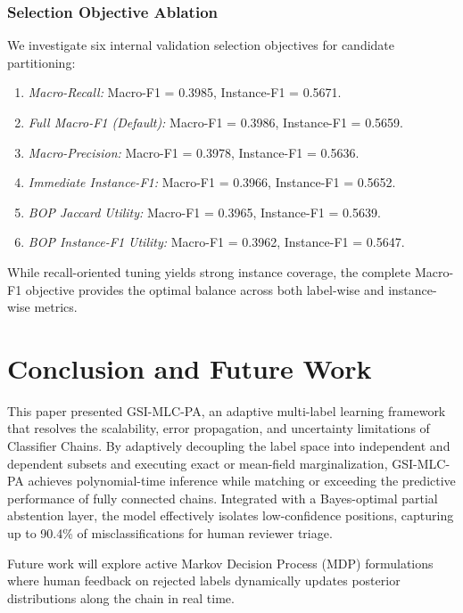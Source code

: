 \documentclass[conference]{IEEEtran}
\begin{document}
\subsubsection{Selection Objective Ablation}
We investigate six internal validation selection objectives for candidate partitioning:
\begin{enumerate}
    \item \textit{Macro-Recall:} Macro-F1 = 0.3985, Instance-F1 = 0.5671.
    \item \textit{Full Macro-F1 (Default):} Macro-F1 = 0.3986, Instance-F1 = 0.5659.
    \item \textit{Macro-Precision:} Macro-F1 = 0.3978, Instance-F1 = 0.5636.
    \item \textit{Immediate Instance-F1:} Macro-F1 = 0.3966, Instance-F1 = 0.5652.
    \item \textit{BOP Jaccard Utility:} Macro-F1 = 0.3965, Instance-F1 = 0.5639.
    \item \textit{BOP Instance-F1 Utility:} Macro-F1 = 0.3962, Instance-F1 = 0.5647.
\end{enumerate}
While recall-oriented tuning yields strong instance coverage, the complete Macro-F1 objective provides the optimal balance across both label-wise and instance-wise metrics.

\section{Conclusion and Future Work}
This paper presented GSI-MLC-PA, an adaptive multi-label learning framework that resolves the scalability, error propagation, and uncertainty limitations of Classifier Chains. By adaptively decoupling the label space into independent and dependent subsets and executing exact or mean-field marginalization, GSI-MLC-PA achieves polynomial-time inference while matching or exceeding the predictive performance of fully connected chains. Integrated with a Bayes-optimal partial abstention layer, the model effectively isolates low-confidence positions, capturing up to 90.4\% of misclassifications for human reviewer triage.

Future work will explore active Markov Decision Process (MDP) formulations where human feedback on rejected labels dynamically updates posterior distributions along the chain in real time.
\end{document}

